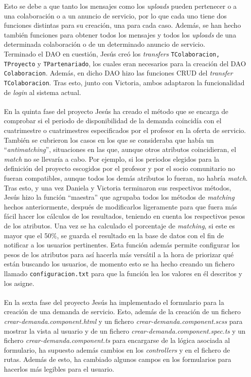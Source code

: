 \documentclass[11pt]{book}
\begin{document}
	Esto se debe a que tanto los mensajes como los \emph{uploads} pueden pertenecer o a una colaboración o a un anuncio de servicio, por lo que cada uno tiene dos funciones distintas para su creación, una para cada caso. Además, se han hecho también funciones para obtener todos los mensajes y todos los \emph{uploads} de una determinada colaboración o de un determinado anuncio de servicio.\\
	Terminado el DAO en cuestión, Jesús creó los \emph{transfers} \texttt{TColaboracion, TProyecto} y \texttt{TPartenariado}, los cuales eran necesarios para la creación del DAO \texttt{Colaboracion}. Además, en dicho DAO hizo las funciones CRUD del \emph{transfer} \texttt{TColaboracion}. Tras esto, junto con Victoria, ambos adaptaron la funcionalidad de \textit{login} al sistema actual.\\\\
	En la quinta fase del proyecto Jesús ha creado el método que se encarga de comprobar si el periodo de disponibilidad de la demanda coincidía con el cuatrimestre o cuatrimestres especificados por el profesor en la oferta de servicio. También se cubrieron los casos en los que se consideraba que había un ``\emph{antimatching}'', situaciones en las que, aunque otros atributos coincidieran, el \textit{match} no se llevaría a cabo. Por ejemplo, si los periodos elegidos para la definición del proyecto escogidos por el profesor y por el socio comunitario no fueran compatibles, aunque todos los demás atributos lo fueran, no habría \emph{match}.\\
	Tras esto, y una vez Daniela y Victoria terminaron sus respectivos métodos, Jesús hizo la función ``maestra'' que agrupaba todos los métodos de \emph{matching} hechos anteriormente, después de modificarlos ligeramente para que fuera más fácil hacer los cálculos de los resultados, teniendo en cuenta los respectivos pesos de los atributos. Una vez se ha calculado el porcentaje de \emph{matching}, si este es mayor que el 50\%, se guarda el resultado en la base de datos con el fin de notificar a los usuarios pertinentes.
	Esta función además permite configurar los pesos de los atributos para así hacerla más versátil a la hora de priorizar qué están buscando los usuarios, de momento esto se ha hecho creando un fichero llamado \texttt{configuracion.txt} para que la función lea los valores en él descritos y los asigne.\\\\
	En la sexta fase del proyecto Jesús ha implementado el formulario para la creación de una demanda de servicio. Esto, además de la creación de un fichero \textit{crear-demanda.component.html} y un fichero \textit{crear-demanda.component.scss} para mostrar la vista al usuario  y de un fichero \textit{crear-demanda.component.spec.ts}
	y un fichero \textit{crear-demanda.component.ts} para encargarse de la lógica asociada al formulario, ha supuesto además cambios en los \emph{controllers} y en el fichero de rutas. Además de esto, ha cambiado algunos campos en los formularios para hacerlos más legibles para el usuario.
	
\end{document}
